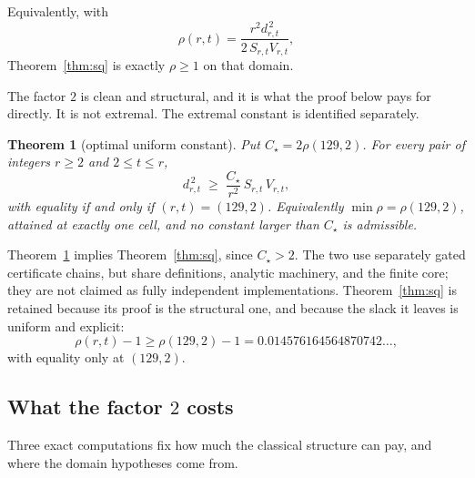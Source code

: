 \documentclass[11pt,a4paper]{article}
\theoremstyle{plain}
\newtheorem{theorem}{Theorem}[section]
\theoremstyle{definition}
\theoremstyle{remark}
\begin{document}
Equivalently, with
\begin{equation}\label{eq:rho}
  \rho(r,t)=\frac{r^2 d_{r,t}^{\,2}}{2\,S_{r,t}V_{r,t}},
\end{equation}
Theorem~\ref{thm:sq} is exactly $\rho\ge1$ on that domain.

The factor $2$ is clean and structural, and it is what the proof below pays for
directly. It is not extremal. The extremal constant is identified separately.

\begin{theorem}[optimal uniform constant]\label{thm:sharp}
Put $C_\star=2\rho(129,2)$. For every pair of integers $r\ge2$ and
$2\le t\le r$,
\[
  d_{r,t}^{\,2}\;\ge\;\frac{C_\star}{r^2}\,S_{r,t}\,V_{r,t},
\]
with equality if and only if $(r,t)=(129,2)$. Equivalently
$\min\rho=\rho(129,2)$, attained at exactly one cell, and no constant larger
than $C_\star$ is admissible.
\end{theorem}

Theorem~\ref{thm:sharp} implies Theorem~\ref{thm:sq}, since
$C_\star>2$. The two use separately gated certificate chains, but share
definitions, analytic machinery, and the finite core; they are not claimed as
fully independent implementations. Theorem~\ref{thm:sq} is retained because
its proof is the structural one, and because the slack it leaves is uniform
and explicit:
\[
  \rho(r,t)-1\ge \rho(129,2)-1
  =0.014576164564870742\ldots,
\]
with equality only at $(129,2)$.

\subsection{What the factor \texorpdfstring{$2$}{2} costs}

Three exact computations fix how much the classical structure can pay, and where
the domain hypotheses come from.
\end{document}
